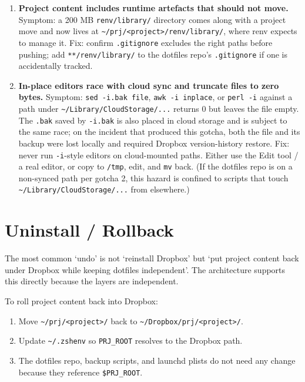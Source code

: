 \documentclass[
  11pt,
  letterpaper,
  DIV=11,
  numbers=noendperiod]{scrartcl}
\providecommand{\tightlist}{%
  \setlength{\itemsep}{0pt}\setlength{\parskip}{0pt}}\usepackage{longtable,booktabs,array}
\begin{document}
\begin{enumerate}
  directly; edit the source in
  \texttt{\textasciitilde{}/dotfiles/launchd/}, then re-run
  \texttt{install.sh} plus \texttt{launchctl\ bootout} and
  \texttt{launchctl\ bootstrap}.
\item
  \textbf{Project content includes runtime artefacts that should not
  move.} Symptom: a 200 MB \texttt{renv/library/} directory comes along
  with a project move and now lives at
  \texttt{\textasciitilde{}/prj/\textless{}project\textgreater{}/renv/library/},
  where renv expects to manage it. Fix: confirm \texttt{.gitignore}
  excludes the right paths before pushing; add \texttt{**/renv/library/}
  to the dotfiles repo's \texttt{.gitignore} if one is accidentally
  tracked.
\item
  \textbf{In-place editors race with cloud sync and truncate files to
  zero bytes.} Symptom: \texttt{sed\ -i.bak\ file},
  \texttt{awk\ -i\ inplace}, or \texttt{perl\ -i} against a path under
  \texttt{\textasciitilde{}/Library/CloudStorage/...} returns 0 but
  leaves the file empty. The \texttt{.bak} saved by \texttt{-i.bak} is
  also placed in cloud storage and is subject to the same race; on the
  incident that produced this gotcha, both the file and its backup were
  lost locally and required Dropbox version-history restore. Fix: never
  run \texttt{-i}-style editors on cloud-mounted paths. Either use the
  Edit tool / a real editor, or copy to \texttt{/tmp}, edit, and
  \texttt{mv} back. (If the dotfiles repo is on a non-synced path per
  gotcha 2, this hazard is confined to scripts that touch
  \texttt{\textasciitilde{}/Library/CloudStorage/...} from elsewhere.)
\end{enumerate}

\section{Uninstall / Rollback}\label{uninstall-rollback}

The most common `undo' is not `reinstall Dropbox' but `put project
content back under Dropbox while keeping dotfiles independent'. The
architecture supports this directly because the layers are independent.

To roll project content back into Dropbox:

\begin{enumerate}
\def\labelenumi{\arabic{enumi}.}
\tightlist
\item
  Move \texttt{\textasciitilde{}/prj/\textless{}project\textgreater{}/}
  back to
  \texttt{\textasciitilde{}/Dropbox/prj/\textless{}project\textgreater{}/}.
\item
  Update \texttt{\textasciitilde{}/.zshenv} so \texttt{PRJ\_ROOT}
  resolves to the Dropbox path.
\item
  The dotfiles repo, backup scripts, and launchd plists do not need any
  change because they reference \texttt{\$PRJ\_ROOT}.
\end{enumerate}
\end{document}

